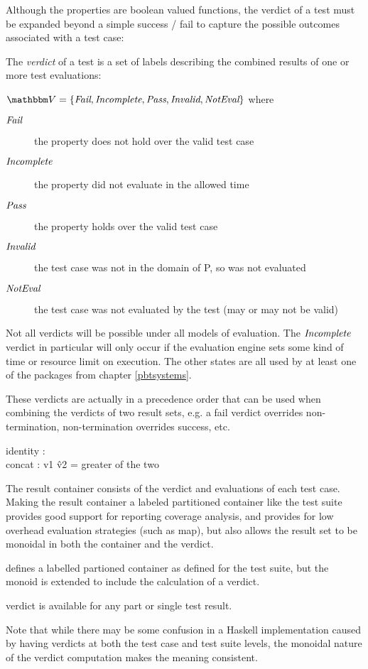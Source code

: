 Although the properties are boolean valued functions,
the verdict of a test must be expanded beyond a simple success / fail
to capture the possible outcomes associated with a test case:

\begin{df}[Verdicts]
	The \emph{verdict} of a test is a set of labels describing the combined results of one or more test evaluations:
	
	$\verdictset = \{ \fail, \nonterm, \success, \invalid, \noteval \}$ where
	
	\begin{description}
		\item[$\emph{Fail}$] the property does not hold over the valid test case
		\item[$\emph{Incomplete}$] the property did not evaluate in the allowed time
		\item[$\emph{Pass}$] the property holds over the valid test case
		\item[$\emph{Invalid}$] the test case was not in the domain of P, so was not evaluated
		\item[$\emph{NotEval}$] the test case was not evaluated by the test (may or may not be valid)
	\end{description}
\end{df}

Not all verdicts will be possible under all models of evaluation.
The $\emph{Incomplete}$ verdict in particular will only occur if the evaluation engine 
sets some kind of time or resource limit on execution.
The other states are all used by at least one of the packages from chapter \ref{pbtsystems}.

These verdicts are actually in a precedence order that can be used when combining 
the verdicts of two result sets,
e.g. a fail verdict overrides non-termination, non-termination overrides success, etc.
\begin{df}
	identity : \noteval \\
	concat : v1 \^ v2 = greater of the two\\
\end{df}

The result container consists of the verdict and evaluations of each test case.
Making the result container a labeled partitioned container like the test suite
provides good support for reporting coverage analysis,
and provides for low overhead evaluation strategies (such as map),
but also allows the result set to be monoidal in both the container and the verdict.

\begin{df}
	defines a labelled partioned container as defined for the test suite,
	but the monoid is extended to include the calculation of a verdict.
	
	verdict is available for any part or single test result.
\end{df}
Note that while there may be some confusion in a Haskell implementation
caused by having verdicts at both the test case and test suite levels,
the monoidal nature of the verdict computation makes the meaning consistent.


